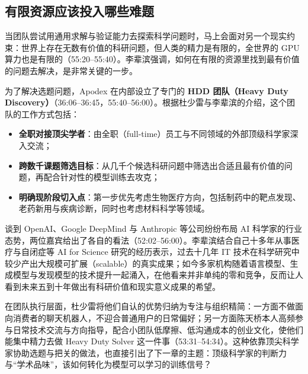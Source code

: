 \documentclass[UTF8,a4paper,11pt,fontset=fandol]{ctexart}
\begin{document}
\subsection{有限资源应该投入哪些难题}
当团队尝试用通用求解与验证能力去探索科学问题时，马上会面对另一个现实约束：世界上存在无数有价值的科研问题，但人类的精力是有限的，全世界的 GPU 算力也是有限的（55:20–55:40）。李辈滨强调，如何在有限的资源里找到最有价值的问题去解决，是非常关键的一步。

为了解决选题问题，Apodex 在内部设立了专门的 \textbf{HDD 团队（Heavy Duty Discovery）}（36:06–36:45，55:40–56:00）。根据杜少雷与李辈滨的介绍，这个团队的工作方式包括：
\begin{itemize}
\item \textbf{全职对接顶尖学者}：由全职（full-time）员工与不同领域的外部顶级科学家深入交流；
\item \textbf{跨数千课题筛选目标}：从几千个候选科研问题中筛选出合适且最有价值的问题，再配合针对性的模型训练去攻克；
\item \textbf{明确现阶段切入点}：第一步优先考虑生物医疗方向，包括制药中的靶点发现、老药新用与疾病诊断，同时也考虑材料科学等领域。
\end{itemize}

谈到 OpenAI、Google DeepMind 与 Anthropic 等公司纷纷布局 AI 科学家的行业态势，两位嘉宾给出了各自的看法（52:02–56:00）。李辈滨结合自己十多年从事医疗与自闭症等 AI for Science 研究的经历表示，过去十几年 IT 技术在科学研究中较少产出大规模可扩展（scalable）的真实成果；如今多家机构随着语言模型、生成模型与发现模型的技术提升一起涌入，在他看来并非单纯的零和竞争，反而让人看到未来五到十年做出有科研价值和现实意义成果的希望。

在团队执行层面，杜少雷将他们自认的优势归纳为专注与组织精简：一方面不做面向消费者的聊天机器人，不迎合普通用户的日常偏好；另一方面陈天桥本人高频参与日常技术交流与方向指导，配合小团队低摩擦、低沟通成本的创业文化，使他们能集中精力去做 Heavy Duty Solver 这一件事（53:31–54:34）。这种依靠顶尖科学家协助选题与把关的做法，也直接引出了下一章的主题：顶级科学家的判断力与“学术品味”，该如何转化为模型可以学习的训练信号？
\end{document}
